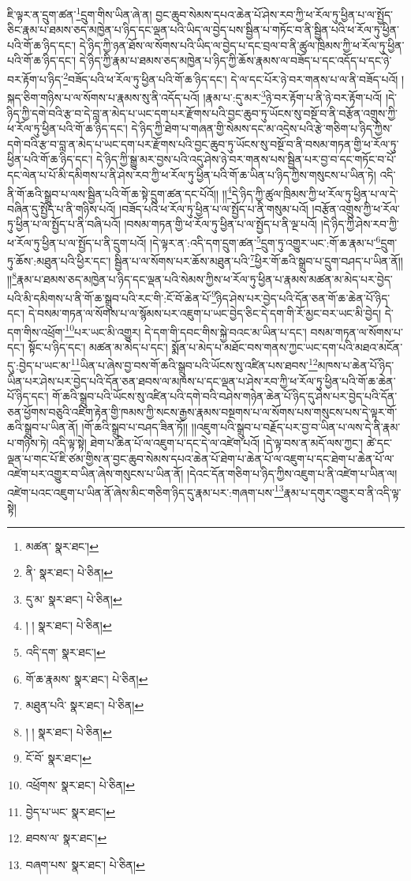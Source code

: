 ཇི་ལྟར་ན་དྲུག་ཚན་\footnote{མཚན་  སྣར་ཐང་། }དྲུག་གིས་ཡིན་ཞེ་ན། བྱང་ཆུབ་སེམས་དཔའ་ཆེན་པོ་ཤེས་རབ་ཀྱི་ཕ་རོལ་ཏུ་ཕྱིན་པ་ལ་སྤྱོད་ཅིང་རྣམ་པ་ཐམས་ཅད་མཁྱེན་པ་ཉིད་དང་ལྡན་པའི་ཡིད་ལ་བྱེད་པས་སྦྱིན་པ་གཏོང་བ་ནི་སྦྱིན་པའི་ཕ་རོལ་ཏུ་ཕྱིན་པའི་གོ་ཆ་ཉིད་དང་། དེ་ཉིད་ཀྱི་ཉན་ཐོས་ལ་སོགས་པའི་ཡིད་ལ་བྱེད་པ་དང་བྲལ་བ་ནི་ཚུལ་ཁྲིམས་ཀྱི་ཕ་རོལ་ཏུ་ཕྱིན་པའི་གོ་ཆ་ཉིད་དང་། དེ་ཉིད་ཀྱི་རྣམ་པ་ཐམས་ཅད་མཁྱེན་པ་ཉིད་ཀྱི་ཆོས་རྣམས་ལ་བཟོད་པ་དང་འདོད་པ་དང་ཉེ་བར་རྟོག་པ་ཉིད་\footnote{ནི་  སྣར་ཐང་།  པེ་ཅིན། }བཟོད་པའི་ཕ་རོལ་ཏུ་ཕྱིན་པའི་གོ་ཆ་ཉིད་དང་། དེ་ལ་དང་པོར་ཉེ་བར་གནས་པ་ལ་ནི་བཟོད་པའོ། །སྐད་ཅིག་གཉིས་པ་ལ་སོགས་པ་རྣམས་སུ་ནི་འདོད་པའོ། །རྣམ་པ་:དུ་མར་\footnote{དུ་མ་  སྣར་ཐང་།  པེ་ཅིན། }ཉེ་བར་རྟོག་པ་ནི་ཉེ་བར་རྟོག་པའོ། །དེ་ཉིད་ཀྱི་དགེ་བའི་རྩ་བ་དེ་བླ་ན་མེད་པ་ཡང་དག་པར་རྫོགས་པའི་བྱང་ཆུབ་ཏུ་ཡོངས་སུ་བསྔོ་བ་ནི་བརྩོན་འགྲུས་ཀྱི་ཕ་རོལ་ཏུ་ཕྱིན་པའི་གོ་ཆ་ཉིད་དང་། དེ་ཉིད་ཀྱི་ཐེག་པ་གཞན་གྱི་སེམས་དང་མ་འདྲེས་པའི་རྩེ་གཅིག་པ་ཉིད་ཀྱིས་དགེ་བའི་རྩ་བ་བླ་ན་མེད་པ་ཡང་དག་པར་རྫོགས་པའི་བྱང་ཆུབ་ཏུ་ཡོངས་སུ་བསྔོ་བ་ནི་བསམ་གཏན་གྱི་ཕ་རོལ་ཏུ་ཕྱིན་པའི་གོ་ཆ་ཉིད་དང་། དེ་ཉིད་ཀྱི་སྒྱུ་མར་བྱས་པའི་འདུ་ཤེས་ཉེ་བར་གནས་པས་སྦྱིན་པར་བྱ་བ་དང་གཏོང་བ་པོ་དང་ལེན་པ་པོ་མི་དམིགས་པ་ནི་ཤེས་རབ་ཀྱི་ཕ་རོལ་ཏུ་ཕྱིན་པའི་གོ་ཆ་ཡིན་པ་ཉིད་ཀྱིས་གསུངས་པ་ཡིན་ཏེ། འདི་ནི་གོ་ཆའི་སྒྲུབ་པ་ལས་སྦྱིན་པའི་གོ་ཆ་སྟེ་དྲུག་ཚན་དང་པོའོ།། །།\footnote{། །  སྣར་ཐང་།  པེ་ཅིན། }དེ་ཉིད་ཀྱི་ཚུལ་ཁྲིམས་ཀྱི་ཕ་རོལ་ཏུ་ཕྱིན་པ་ལ་དེ་བཞིན་དུ་སྤྱོད་པ་ནི་གཉིས་པའོ། །བཟོད་པའི་ཕ་རོལ་ཏུ་ཕྱིན་པ་ལ་སྤྱོད་པ་ནི་གསུམ་པའོ། །བརྩོན་འགྲུས་ཀྱི་ཕ་རོལ་ཏུ་ཕྱིན་པ་ལ་སྤྱོད་པ་ནི་བཞི་པའོ། །བསམ་གཏན་གྱི་ཕ་རོལ་ཏུ་ཕྱིན་པ་ལ་སྤྱོད་པ་ནི་ལྔ་པའོ། །དེ་ཉིད་ཀྱི་ཤེས་རབ་ཀྱི་ཕ་རོལ་ཏུ་ཕྱིན་པ་ལ་སྤྱོད་པ་ནི་དྲུག་པའོ། །དེ་ལྟར་ན་:འདི་དག་དྲུག་ཚན་\footnote{འདི་དག་  སྣར་ཐང་། }དྲུག་ཏུ་འགྱུར་ཡང་:གོ་ཆ་རྣམ་པ་\footnote{གོ་ཆ་རྣམས་  སྣར་ཐང་།  པེ་ཅིན། }དྲུག་ཏུ་ཆོས་:མཐུན་པའི་ཕྱིར་དང་། སྦྱིན་པ་ལ་སོགས་པར་ཆོས་མཐུན་པའི་\footnote{མཐུན་པའི་  སྣར་ཐང་།  པེ་ཅིན། }ཕྱིར་གོ་ཆའི་སྒྲུབ་པ་དྲུག་བཤད་པ་ཡིན་ནོ།། །།\footnote{། །  སྣར་ཐང་།  པེ་ཅིན། }རྣམ་པ་ཐམས་ཅད་མཁྱེན་པ་ཉིད་དང་ལྡན་པའི་སེམས་ཀྱིས་ཕ་རོལ་ཏུ་ཕྱིན་པ་རྣམས་མཚན་མ་མེད་པར་བྱེད་པའི་མི་དམིགས་པ་ནི་གོ་ཆ་སྒྲུབ་པའི་རང་གི་:ངོ་བོ་ཆེན་པོ་\footnote{ངོ་བོ་  སྣར་ཐང་། }ཉིད་ཤེས་པར་བྱེད་པའི་དོན་ཅན་གོ་ཆ་ཆེན་པོ་ཉིད་དང་། དེ་བསམ་གཏན་ལ་སོགས་པ་ལ་སྙོམས་པར་འཇུག་པ་ཡང་བྱེད་ཅིང་དེ་དག་གི་རོ་མྱང་བར་ཡང་མི་བྱེད། དེ་དག་གིས་འཕྲོག་\footnote{འཕྲོགས་  སྣར་ཐང་།  པེ་ཅིན། }པར་ཡང་མི་འགྱུར། དེ་དག་གི་དབང་གིས་སྐྱེ་བའང་མ་ཡིན་པ་དང་། བསམ་གཏན་ལ་སོགས་པ་དང་། སྟོང་པ་ཉིད་དང་། མཚན་མ་མེད་པ་དང་། སྨོན་པ་མེད་པ་མཐོང་བས་གནས་ཀྱང་ཡང་དག་པའི་མཐའ་མངོན་དུ་:བྱེད་པ་ཡང་མ་\footnote{བྱེད་པ་ཡང་  སྣར་ཐང་། }ཡིན་པ་ཞེས་བྱ་བས་གོ་ཆའི་སྒྲུབ་པའི་ཡོངས་སུ་འཛིན་པས་ཐབས་\footnote{ཐབས་ལ་  སྣར་ཐང་། }མཁས་པ་ཆེན་པོ་ཉིད་ཡིན་པར་ཤེས་པར་བྱེད་པའི་དོན་ཅན་ཐབས་ལ་མཁས་པ་དང་ལྡན་པ་ཤེས་རབ་ཀྱི་ཕ་རོལ་ཏུ་ཕྱིན་པའི་གོ་ཆ་ཆེན་པོ་ཉིད་དང་། གོ་ཆའི་སྒྲུབ་པའི་ཡོངས་སུ་འཛིན་པའི་དགེ་བའི་བཤེས་གཉེན་ཆེན་པོ་ཉིད་དུ་ཤེས་པར་བྱེད་པའི་དོན་ཅན་ཕྱོགས་བཅུའི་འཇིག་རྟེན་གྱི་ཁམས་ཀྱི་སངས་རྒྱས་རྣམས་བསྔགས་པ་ལ་སོགས་པས་གསུངས་པས་དེ་ལྟར་གོ་ཆའི་སྒྲུབ་པ་ཡིན་ནོ། །གོ་ཆའི་སྒྲུབ་པ་བཤད་ཟིན་ཏོ།། །།འཇུག་པའི་སྒྲུབ་པ་བརྗོད་པར་བྱ་བ་ཡིན་པ་ལས་དེ་ནི་རྣམ་པ་གཉིས་ཏེ། འདི་ལྟ་སྟེ། ཐེག་པ་ཆེན་པོ་ལ་འཇུག་པ་དང་དེ་ལ་འཛེག་པའོ། །དེ་ལྟ་བས་ན་མདོ་ལས་ཀྱང་། ཚེ་དང་ལྡན་པ་གང་པོ་ཇི་ཙམ་གྱིས་ན་བྱང་ཆུབ་སེམས་དཔའ་ཆེན་པོ་ཐེག་པ་ཆེན་པོ་ལ་འཇུག་པ་དང་ཐེག་པ་ཆེན་པོ་ལ་འཛེག་པར་འགྱུར་བ་ཡིན་ཞེས་གསུངས་པ་ཡིན་ནོ། །དེའང་དོན་གཅིག་པ་ཉིད་ཀྱིས་འཇུག་པ་ནི་འཛེག་པ་ཡིན་ལ། འཛེག་པའང་འཇུག་པ་ཡིན་ནོ་ཞེས་མིང་གཅིག་ཉིད་དུ་རྣམ་པར་:གཞག་པས་\footnote{བཞག་པས་  སྣར་ཐང་།  པེ་ཅིན། }རྣམ་པ་དགུར་འགྱུར་བ་ནི་འདི་ལྟ་སྟེ། 